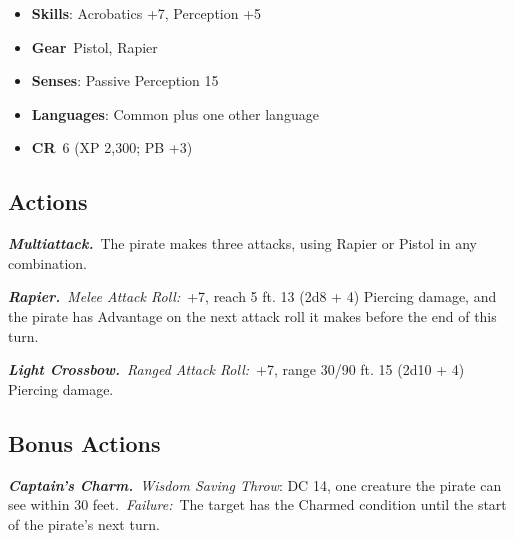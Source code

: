 \documentclass[10pt,twocolumn]{article}
\newcommand{\sectionsize}{\LARGE}
\newcommand{\subsectionsize}{\Large}
\newcommand{\subsubsectionsize}{\large}
\let\oldtextbf\textbf
\renewcommand{\textbf}[1]{\oldtextbf{{#1}}}
\providecommand{\tightlist}{
  \setlength{\itemsep}{4pt}
  \setlength{\topsep}{0pt}
  \setlength{\parsep}{0pt}
  \setlength{\parskip}{0pt}
  \setlength{\partopsep}{0pt}
}
\begin{document}
\setlength{\itemsep}{0pt}

\begin{itemize}
\tightlist
\item
  \textbf{Skills}: Acrobatics +7, Perception +5
\item
  \textbf{Gear}~Pistol, Rapier
\item
  \textbf{Senses}: Passive Perception 15
\item
  \textbf{Languages}: Common plus one other language
\item
  \textbf{CR}~6 (XP 2,300; PB +3)
\end{itemize}

\subsection{Actions}\label{actions-7}

\emph{\textbf{Multiattack.}}~The pirate makes three attacks, using
Rapier or Pistol in any combination.

\emph{\textbf{Rapier.}}~\emph{Melee Attack Roll:}~+7, reach 5 ft. 13
(2d8 + 4) Piercing damage, and the pirate has Advantage on the next
attack roll it makes before the end of this turn.

\emph{\textbf{Light Crossbow.}}~\emph{Ranged Attack Roll:}~+7, range
30/90 ft. 15 (2d10 + 4) Piercing damage.

\subsection{Bonus Actions}\label{bonus-actions-1}

\emph{\textbf{Captain's Charm.}}~\emph{Wisdom Saving Throw}: DC 14, one
creature the pirate can see within 30 feet.~\emph{Failure:}~The target
has the Charmed condition until the start of the pirate's next turn.

\endgroup

\vfill\break

\begingroup

\makeatletter
{}
\monsterFont
\fontsize{9pt}{10pt}\selectfont
\setlength{\parskip}{4pt}
\makeatletter
{}

\renewcommand{\sectionsize}{\Large}
\renewcommand{\subsectionsize}{\normalsize}
\renewcommand{\subsubsectionsize}{\normalsize}
\end{document}
